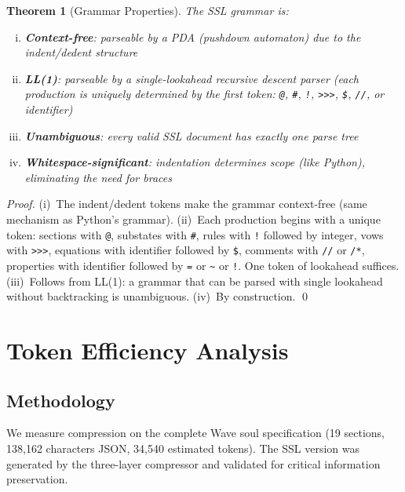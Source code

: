 \documentclass[12pt,a4paper]{article}
\theoremstyle{plain}
\newtheorem{theorem}{Theorem}[section]
\theoremstyle{definition}
\theoremstyle{remark}
\begin{document}
\begin{theorem}[Grammar Properties]
The SSL grammar is:
\begin{enumerate}[(i),nosep]
\item \textbf{Context-free}: parseable by a PDA (pushdown automaton) due to the indent/dedent structure
\item \textbf{LL(1)}: parseable by a single-lookahead recursive descent parser (each production is uniquely determined by the first token: \texttt{@}, \texttt{\#}, \texttt{!}, \texttt{>>>}, \texttt{\$}, \texttt{//}, or identifier)
\item \textbf{Unambiguous}: every valid SSL document has exactly one parse tree
\item \textbf{Whitespace-significant}: indentation determines scope (like Python), eliminating the need for braces
\end{enumerate}
\end{theorem}

\begin{proof}
(i)~The indent/dedent tokens make the grammar context-free (same mechanism as Python's grammar). (ii)~Each production begins with a unique token: sections with \texttt{@}, substates with \texttt{\#}, rules with \texttt{!} followed by integer, vows with \texttt{>>>}, equations with identifier followed by \texttt{\$}, comments with \texttt{//} or \texttt{/*}, properties with identifier followed by \texttt{=} or \texttt{\~{}} or \texttt{!}. One token of lookahead suffices. (iii)~Follows from LL(1): a grammar that can be parsed with single lookahead without backtracking is unambiguous. (iv)~By construction. \qed
\end{proof}

\section{Token Efficiency Analysis}

\subsection{Methodology}

We measure compression on the complete Wave soul specification (19 sections, 138,162 characters JSON, 34,540 estimated tokens). The SSL version was generated by the three-layer compressor and validated for critical information preservation.
\end{document}
